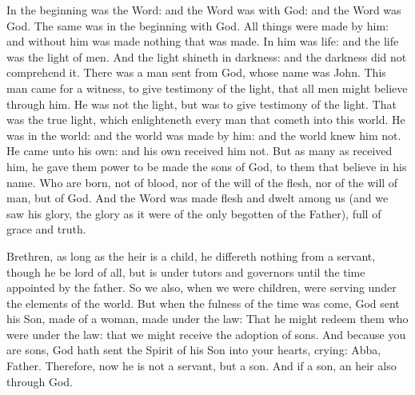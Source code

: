 \begin{multicols}{2}


In the beginning was the Word: and the Word was with God: and the Word was God.
The same was in the beginning with God.  All things were made by him: and
without him was made nothing that was made.  In him was life: and the life was
the light of men.  And the light shineth in darkness: and the darkness did not
comprehend it.  There was a man sent from God, whose name was John.  This man
came for a witness, to give testimony of the light, that all men might believe
through him.  He was not the light, but was to give testimony of the light.
That was the true light, which enlighteneth every man that cometh into this
world.  He was in the world: and the world was made by him: and the world knew
him not.  He came unto his own: and his own received him not.  But as many as
received him, he gave them power to be made the sons of God, to them that
believe in his name.  Who are born, not of blood, nor of the will of the flesh,
nor of the will of man, but of God.  And the Word was made flesh and dwelt
among us (and we saw his glory, the glory as it were of the only begotten of
the Father), full of grace and truth.



\bigskip



Brethren, as long as the heir is a child, he differeth nothing from a servant, though he
be lord of all, but is under tutors and governors until the time appointed by
the father.  So we also, when we were children, were serving under the elements
of the world.   But when the fulness of the time was come, God sent his Son, made
of a woman, made under the law: That he might redeem them who were under the
law: that we might receive the adoption of sons.  And because you are sons, God
hath sent the Spirit of his Son into your hearts, crying: Abba, Father.
Therefore, now he is not a servant, but a son. And if a son, an heir also
through God.




\end{multicols}
